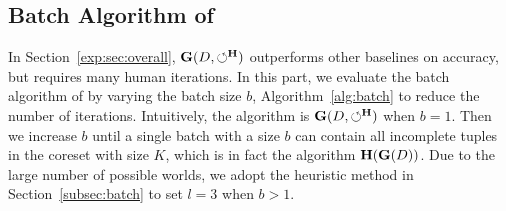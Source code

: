 
\subsection{Batch Algorithm of \ours}
\label{exp:sec:batchalgo}

In Section~\ref{exp:sec:overall}, $\mathbf{G}(D,\circlearrowleft^\mathbf{H})$ outperforms other baselines on accuracy, but requires many human iterations. In this part, we evaluate  the batch algorithm of \ours by varying the batch size $b$, \ie Algorithm~\ref{alg:batch} to reduce the number of iterations. Intuitively, the algorithm is  $\mathbf{G}(D,\circlearrowleft^\mathbf{H})$  when $b=1$. 
Then we increase $b$ until a single batch with a size $b$ can contain all incomplete tuples in the coreset with size $K$, which is in fact the algorithm $\mathbf{H}(\mathbf{G}(D))$.
 Due to the large number of possible worlds, we adopt the heuristic method in Section~\ref{subsec:batch} to set $l=3$ when $b>1$. 

